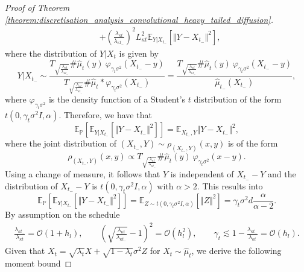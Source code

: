 \begin{proof}[Proof of Theorem \ref{theorem:discretisation_analysis_convolutional_heavy_tailed_diffusion}]
\begin{align*}
        &+  \left(\frac{\lambda_{\kappa t}}{\lambda_{\kappa t_-}}\right)^2 L_{\kappa t}^2 \mathbb{E}_{Y|X_{t_-}}\left[\Vert Y-X_{t_-}\Vert^{2}\right],
    \end{align*}
    where the distribution of $Y|X_t$ is given by
    \begin{equation*}
        Y|X_{t_-}\sim \frac{T_{\sqrt{\frac{\lambda_{\kappa t}}{\lambda_{\kappa t_-}}}} \#\hat{\mu}_t (y)\ \varphi_{\gamma_t\sigma^2}(X_{t_-}-y)}{T_{\sqrt{\frac{\lambda_{\kappa t}}{\lambda_{\kappa t_-}}}} \#\hat{\mu}_t * \varphi_{\gamma_t\sigma^2} (X_{t_-})} = \frac{T_{\sqrt{\frac{\lambda_{\kappa t}}{\lambda_{\kappa t_-}}}} \#\hat{\mu}_t (y)\ \varphi_{\gamma_t\sigma^2}(X_{t_-}-y)}{\hat{\mu}_{t_-} (X_{t_-})},
    \end{equation*}
    where $\varphi_{\gamma_t\sigma^2}$ is the density function of a Student's $t$ distribution of the form $t\left(0, \gamma_t\sigma^2 I, \alpha\right)$.
Therefore, we have that
\begin{equation*}
    \mathbb{E}_{\mathbb{P}}\left[\mathbb{E}_{Y|X_{t_-}}\left[\Vert Y-X_{t_-}\Vert^{2}\right]\right] = \mathbb{E}_{X_{t_-}, Y} \Vert Y-X_{t_-}\Vert^2,
\end{equation*}
where the joint distribution of $( X_{t_-}, Y)\sim \rho_{( X_{t_-}, Y)}(x, y)$ is of the form
\begin{equation*}
    \rho_{( X_{t_-}, Y)}(x, y)\propto T_{\sqrt{\frac{\lambda_{\kappa t}}{\lambda_{\kappa t_-}}}} \#\hat{\mu}_t (y)\ \varphi_{\gamma_t\sigma^2}(x-y).
\end{equation*}
Using a change of measure, it follows that $Y$ is independent of $X_{t_-}- Y$ and the distribution of $X_{t_-}- Y$ is $t(0, \gamma_t\sigma^2 I, \alpha)$ with $\alpha>2$. This results into
\begin{equation*}
\mathbb{E}_{\mathbb{P}}\left[\mathbb{E}_{Y|X_{t_-}}\left[\Vert Y-X_{t_-}\Vert^{2}\right]\right] = \mathbb{E}_{Z\sim t(0, \gamma_t\sigma^2 I, \alpha)}\left[\Vert Z\Vert^2\right] = \gamma_t\sigma^2 d\frac{\alpha}{\alpha-2}.
\end{equation*}
By assumption on the schedule 
\begin{align*}
    \frac{\lambda_{\kappa t_-}}{\lambda_{\kappa t}} = \mathcal{O}(1+ h_l)
, \quad \quad \left(\sqrt{\frac{\lambda_{\kappa t}}{\lambda_{\kappa t_-}}}-1\right)^2 = \mathcal{O}(h_l^2), \quad\quad \gamma_t \lesssim 1-\frac{\lambda_{\kappa t_-}}{\lambda_{\kappa t}}= \mathcal{O}\left( h_l\right).
\end{align*}
Given that $X_t = \sqrt{\lambda_t} X + \sqrt{1-\lambda_t} \sigma^2 Z$ for $X_t\sim\hat{\mu}_t$, we derive the following moment bound

\end{proof}
